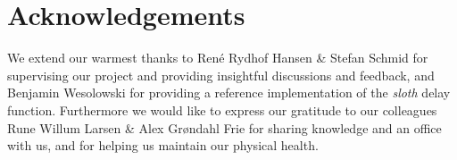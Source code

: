 \section{Acknowledgements}
We extend our warmest thanks to René Rydhof Hansen \& Stefan Schmid for supervising our project and providing insightful discussions and feedback, and Benjamin Wesolowski for providing a reference implementation of the \emph{sloth} delay function.
Furthermore we would like to express our gratitude to our colleagues Rune Willum Larsen \& Alex Grøndahl Frie for sharing knowledge and an office with us, and for helping us maintain our physical health.
